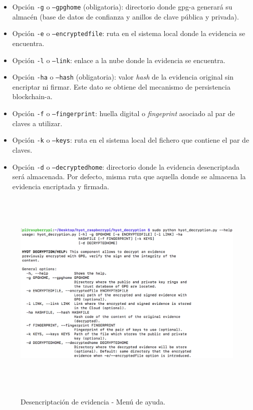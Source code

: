 \documentclass[12pt,a4paper, twoside]{report}
\begin{document}
	\begin{itemize}
		\item Opción \texttt{-g} o \texttt{--gpghome} (obligatoria): directorio donde \gls{gpg-a} generará su almacén (base de datos de confianza y anillos de clave pública y privada).
		\item Opción \texttt{-e} o \texttt{--encryptedfile}: ruta en el sistema local donde la evidencia se encuentra.
		\item Opción \texttt{-l} o \texttt{--link}: enlace a la nube donde la evidencia se encuentra.
		\item Opción \texttt{-ha} o \texttt{--hash} (obligatoria): valor \textit{hash} de la evidencia original sin encriptar ni firmar. Este dato se obtiene del mecanismo de persistencia \gls{blockchain-a}.
		\item Opción \texttt{-f} o \texttt{--fingerprint}: huella digital o \textit{fingeprint} asociado al par de claves a utilizar.
		\item Opción \texttt{-k} o \texttt{--keys}: ruta en el sistema local del fichero que contiene el par de claves. 
		\item Opción \texttt{-d} o \texttt{--decryptedhome}: directorio donde la evidencia desencriptada será almacenada. Por defecto, misma ruta que aquella donde se almacena la evidencia encriptada y firmada.
	\end{itemize}

	\begin{figure}[!ht]   
		\caption{Desencriptación de evidencia - Menú de ayuda.} 
		\begin{center} 
			\includegraphics[width=16cm,height=10cm]{Images/userGuide/evidence/help} \\
			\label{fig:userguide_evidence_help} 
		\end{center}  
	\end{figure}
	
\end{document}
